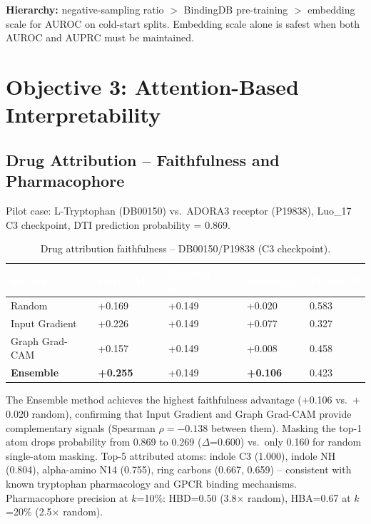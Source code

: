 \documentclass[12pt,a4paper,oneside]{report}
\newcommand{\sig}[1]{\textbf{#1}}
\begin{document}
\textbf{Hierarchy:} negative-sampling ratio $>$ BindingDB pre-training $>$ embedding scale for AUROC on cold-start splits. Embedding scale alone is safest when both AUROC and AUPRC must be maintained.

\section{Objective 3: Attention-Based Interpretability}

\subsection{Drug Attribution -- Faithfulness and Pharmacophore}

Pilot case: L-Tryptophan (DB00150) vs.\ ADORA3 receptor (P19838), Luo\_17 C3 checkpoint, DTI prediction probability = 0.869.

\begin{table}[htbp]
\centering
\caption{Drug attribution faithfulness -- DB00150/P19838 (C3 checkpoint).}
\label{tab:faith}
\begin{tabular}{@{}L{3cm}C{2.0cm}C{2.0cm}C{2.0cm}C{1.8cm}@{}}
\toprule
{}
\textcolor{white}{\textbf{Method}} &
\textcolor{white}{\textbf{Faith.\ AUC}} &
\textcolor{white}{\textbf{Random AUC}} &
\textcolor{white}{\textbf{Advantage}} &
\textcolor{white}{\textbf{PharmAP}} \\
\midrule
{}
Random         & +0.169 & +0.149 & +0.020 & 0.583 \\
Input Gradient & +0.226 & +0.149 & +0.077 & 0.327 \\
Graph Grad-CAM & +0.157 & +0.149 & +0.008 & 0.458 \\
\sig{Ensemble} & \sig{+0.255} & +0.149 & \sig{+0.106} & 0.423 \\
\bottomrule
\end{tabular}
\end{table}

The Ensemble method achieves the highest faithfulness advantage ($+$0.106 vs.\ $+$0.020 random), confirming that Input Gradient and Graph Grad-CAM provide complementary signals (Spearman $\rho = -0.138$ between them). Masking the top-1 atom drops probability from 0.869 to 0.269 ($\Delta$=0.600) vs.\ only 0.160 for random single-atom masking. Top-5 attributed atoms: indole C3 (1.000), indole NH (0.804), alpha-amino N14 (0.755), ring carbons (0.667, 0.659) -- consistent with known tryptophan pharmacology and GPCR binding mechanisms. Pharmacophore precision at $k$=10\%: HBD=0.50 (3.8$\times$ random), HBA=0.67 at $k$=20\% (2.5$\times$ random).
\end{document}
